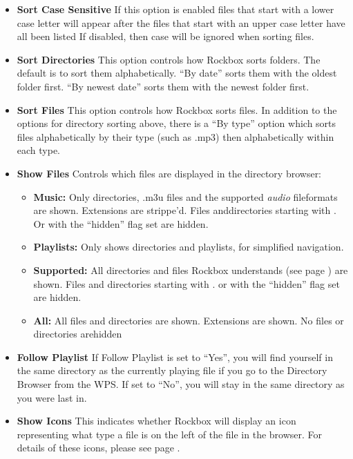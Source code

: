 \begin{itemize}
  \begin{itemize}
  \item \textbf{Sort Case Sensitive}
    If this option is enabled files that start with a lower case letter will appear after the files that start with an upper case letter have all been listed  If disabled, then case will be ignored when sorting files.
  \item \textbf{Sort Directories}
    This option controls how Rockbox sorts folders.  The default is to sort them alphabetically.  ``By date'' sorts them with the oldest folder first.  ``By newest date'' sorts them with the newest folder first.
    
  \item \textbf{Sort Files}
    This option controls how Rockbox sorts files.  In addition to the options for directory sorting above, there is a ``By type'' option which sorts files alphabetically by their type (such as .mp3) then alphabetically within each type.
    
  \item \textbf{\label{ref:ShowFiles}Show Files}
    Controls which files are displayed in the directory browser:
    
    \begin{itemize}
    \item \textbf{Music: }
      Only directories, .m3u files and the supported \emph{audio} fileformats are shown. Extensions are strippe'd. Files anddirectories starting with . Or with the ``hidden'' flag set are hidden.
    \item \textbf{Playlists:} 
      Only shows directories and playlists, for simplified navigation.
    \item \textbf{Supported:} 
      All directories and files Rockbox understands (see page \pageref{ref:Supportedfileformats}) are shown. Files and directories starting with . or with the ``hidden'' flag set are hidden.
    \item \textbf{All:}
      All files and directories are shown. Extensions are shown. No files or directories arehidden
    \end{itemize}
    
  \item \textbf{Follow Playlist}
    If Follow Playlist is set to ``Yes'', you will find yourself in the same directory as the currently playing file if you go to the Directory Browser from the WPS. If set to ``No'', you will stay in the same directory as you were last in.
    
  \item \textbf{Show Icons}
    This indicates whether Rockbox will display an icon representing what type a file is on the left of the file in the browser.  For details of these icons, please see page \pageref{ref:Supportedfileformats}.
  \end{itemize}
  

\end{itemize}
